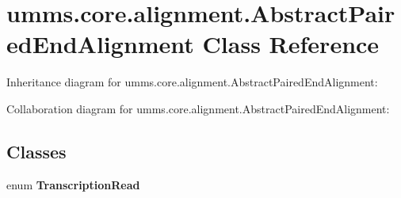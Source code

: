 \hypertarget{classumms_1_1core_1_1alignment_1_1_abstract_paired_end_alignment}{\section{umms.\+core.\+alignment.\+Abstract\+Paired\+End\+Alignment Class Reference}
\label{classumms_1_1core_1_1alignment_1_1_abstract_paired_end_alignment}
}


Inheritance diagram for umms.\+core.\+alignment.\+Abstract\+Paired\+End\+Alignment\+:


Collaboration diagram for umms.\+core.\+alignment.\+Abstract\+Paired\+End\+Alignment\+:
\subsection*{Classes}
\begin{DoxyCompactItemize}
\item 
enum {\bfseries Transcription\+Read}
\end{DoxyCompactItemize}
